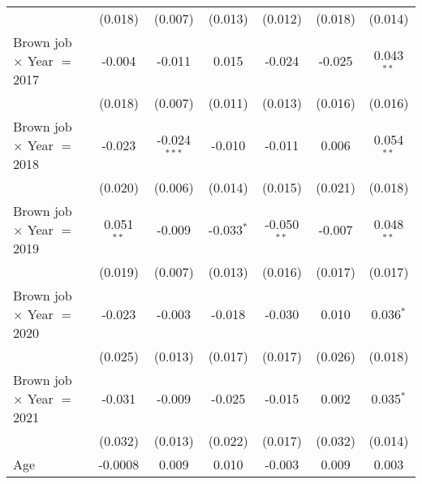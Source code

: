 \begin{table}[htbp]
\begin{tabular}{lcccccc}
                                        & (0.018)                & (0.007)                 & (0.013)                 & (0.012)                 & (0.018)                 & (0.014)\\   
      Brown job $\times$ Year $=$ 2017  & -0.004                 & -0.011                  & 0.015                   & -0.024                  & -0.025                  & 0.043$^{**}$\\   
                                        & (0.018)                & (0.007)                 & (0.011)                 & (0.013)                 & (0.016)                 & (0.016)\\   
      Brown job $\times$ Year $=$ 2018  & -0.023                 & -0.024$^{***}$          & -0.010                  & -0.011                  & 0.006                   & 0.054$^{**}$\\   
                                        & (0.020)                & (0.006)                 & (0.014)                 & (0.015)                 & (0.021)                 & (0.018)\\   
      Brown job $\times$ Year $=$ 2019  & 0.051$^{**}$           & -0.009                  & -0.033$^{*}$            & -0.050$^{**}$           & -0.007                  & 0.048$^{**}$\\   
                                        & (0.019)                & (0.007)                 & (0.013)                 & (0.016)                 & (0.017)                 & (0.017)\\   
      Brown job $\times$ Year $=$ 2020  & -0.023                 & -0.003                  & -0.018                  & -0.030                  & 0.010                   & 0.036$^{*}$\\   
                                        & (0.025)                & (0.013)                 & (0.017)                 & (0.017)                 & (0.026)                 & (0.018)\\   
      Brown job $\times$ Year $=$ 2021  & -0.031                 & -0.009                  & -0.025                  & -0.015                  & 0.002                   & 0.035$^{*}$\\   
                                        & (0.032)                & (0.013)                 & (0.022)                 & (0.017)                 & (0.032)                 & (0.014)\\   
      Age                               & -0.0008                & 0.009                   & 0.010                   & -0.003                  & 0.009                   & 0.003\\   

\end{tabular}
\end{table}
